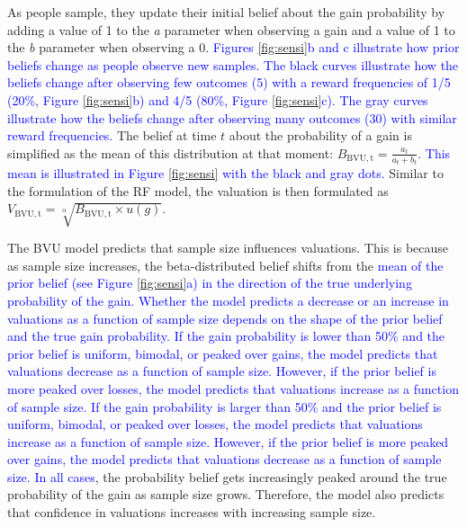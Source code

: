 \documentclass[a4paper, man, natbib, floatsintext]{apa6} %
\begin{document}
As people sample, they update their initial belief about the gain probability by adding a value of 1 to the \textit{a} parameter when observing a gain and a value of 1 to the \textit{b} parameter when observing a 0. 
\textcolor{blue}{Figures \ref{fig:sensi}b  and c illustrate how prior beliefs change as people observe new samples. The black curves illustrate how the beliefs change after observing few outcomes (5) with a reward frequencies of 1/5 (20\%, Figure \ref{fig:sensi}b)  and 4/5 (80\%, Figure \ref{fig:sensi}c). The gray curves illustrate how the beliefs change after observing many outcomes (30) with similar reward frequencies.}
The belief at time $t$ about the probability of a gain is simplified as the mean of this distribution at that moment: ${B}_\mathrm{BVU, t} = \frac{a_{t}}{a_{t} + b_{t}}$. 
\textcolor{blue}{This mean is illustrated in Figure \ref{fig:sensi} with the black and gray dots.} Similar to the formulation of the RF model, the valuation is then formulated as $V_\mathrm{BVU, t} = \sqrt[\alpha]{{B}_\mathrm{BVU, t} \times u({g})}$.

The BVU model predicts that sample size influences valuations. This is because as sample size increases, the beta-distributed belief shifts from the \textcolor{blue}{mean of the prior belief (see Figure \ref{fig:sensi}a) in the direction of the true underlying probability of the gain. Whether the model predicts a decrease or an increase in valuations as a function of sample size depends on the shape of the prior belief and the true gain probability. If the gain probability is lower than 50\% and the prior belief is uniform, bimodal, or peaked over gains, the model predicts that valuations decrease as a function of sample size. However, if the prior belief is more peaked over losses, the model predicts that valuations increase as a function of sample size. If the gain probability is larger than 50\% and the prior belief is uniform, bimodal, or peaked over losses, the model predicts that valuations increase as a function of sample size. However, if the prior belief is more peaked over gains, the model predicts that valuations decrease as a function of sample size. In all cases}, the probability belief gets increasingly peaked around the true probability of the gain as sample size grows. Therefore, the model also predicts that confidence in valuations increases with increasing sample size. %
\end{document}
